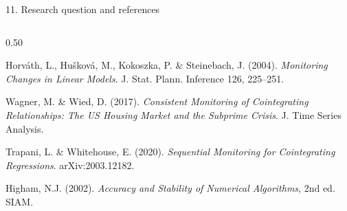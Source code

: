 \documentclass[aspectratio=169,10pt]{beamer}
\begin{document}
\begin{frame}{11. Research question and references}
\begin{columns}[T,onlytextwidth]
\begin{column}{0.50\textwidth}
{Horv\'ath, L., Hu\v{s}kov\'a, M., Kokoszka, P. \& Steinebach, J. (2004). \emph{Monitoring Changes in Linear Models}. J. Stat. Plann. Inference 126, 225--251.\par\vspace{0.04cm}
Wagner, M. \& Wied, D. (2017). \emph{Consistent Monitoring of Cointegrating Relationships: The US Housing Market and the Subprime Crisis}. J. Time Series Analysis.\par\vspace{0.04cm}
Trapani, L. \& Whitehouse, E. (2020). \emph{Sequential Monitoring for Cointegrating Regressions}. arXiv:2003.12182.\par\vspace{0.04cm}
Higham, N.J. (2002). \emph{Accuracy and Stability of Numerical Algorithms}, 2nd ed. SIAM.
}
\end{column}
\end{columns}
\end{frame}
\end{document}
